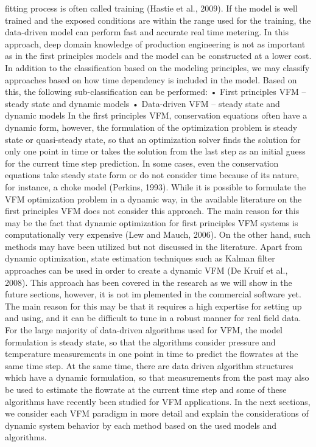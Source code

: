 fitting process is often called training (Hastie et al., 2009). If the model
is well trained and the exposed conditions are within the range used for
the training, the data-driven model can perform fast and accurate realtime metering. In this approach, deep domain knowledge of production
engineering is not as important as in the first principles models and the
model can be constructed at a lower cost.
In addition to the classification based on the modeling principles,
we may classify approaches based on how time dependency is included
in the model. Based on this, the following sub-classification can be
performed:
• First principles VFM – steady state and dynamic models
• Data-driven VFM – steady state and dynamic models
In the first principles VFM, conservation equations often have a
dynamic form, however, the formulation of the optimization problem is
steady state or quasi-steady state, so that an optimization solver finds
the solution for only one point in time or takes the solution from the last
step as an initial guess for the current time step prediction. In some
cases, even the conservation equations take steady state form or do not
consider time because of its nature, for instance, a choke model
(Perkins, 1993). While it is possible to formulate the VFM optimization
problem in a dynamic way, in the available literature on the first
principles VFM does not consider this approach. The main reason for
this may be the fact that dynamic optimization for first principles VFM
systems is computationally very expensive (Lew and Mauch, 2006). On
the other hand, such methods may have been utilized but not discussed
in the literature.
Apart from dynamic optimization, state estimation techniques such
as Kalman filter approaches can be used in order to create a dynamic
VFM (De Kruif et al., 2008). This approach has been covered in the
research as we will show in the future sections, however, it is not implemented in the commercial software yet. The main reason for this
may be that it requires a high expertise for setting up and using, and it
can be difficult to tune in a robust manner for real field data.
For the large majority of data-driven algorithms used for VFM, the
model formulation is steady state, so that the algorithms consider
pressure and temperature measurements in one point in time to predict
the flowrates at the same time step. At the same time, there are datadriven algorithm structures which have a dynamic formulation, so that
measurements from the past may also be used to estimate the flowrate
at the current time step and some of these algorithms have recently
been studied for VFM applications. In the next sections, we consider
each VFM paradigm in more detail and explain the considerations of
dynamic system behavior by each method based on the used models
and algorithms.


